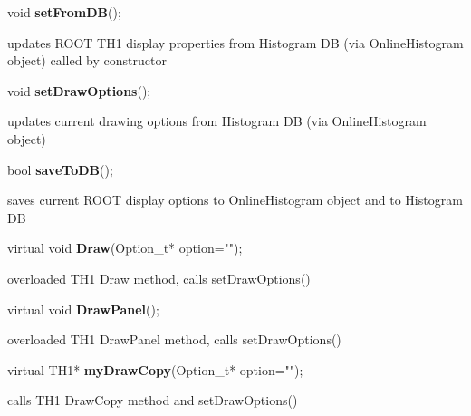 \item    void {\bf setFromDB}();


 updates ROOT TH1 display properties from Histogram DB (via OnlineHistogram object) 
 called by constructor


\item    void {\bf setDrawOptions}();


 updates current drawing options from Histogram DB (via OnlineHistogram object)


\item    bool {\bf saveToDB}();


 saves current ROOT display options to OnlineHistogram object and to Histogram DB


\item    virtual void {\bf Draw}(Option\_t* option="");


 overloaded TH1 Draw method, calls setDrawOptions()


\item    virtual void {\bf DrawPanel}();


 overloaded TH1 DrawPanel method, calls setDrawOptions()


\item    virtual TH1* {\bf myDrawCopy}(Option\_t* option="");


 calls TH1 DrawCopy method and setDrawOptions()


